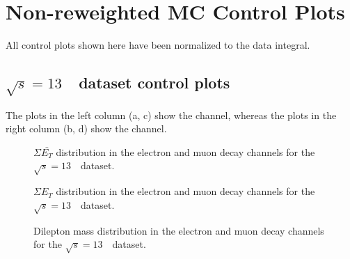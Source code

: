 \section{\ptz Non-reweighted MC Control Plots}
\label{sec:zpt_nonrew_cp}

All control plots shown here have been normalized to the data integral.

\subsection{$\sqrt{s} = 13$~\TeV\ dataset control plots}
\label{subsec:Z_CP_MCnorew}
The plots in the left column (a, c) show the \Zee channel, whereas the plots in the right column (b, d) show the \Zmm channel.

\begin{figure}[h]
\centering
{}
\caption{$\Sigma \bar{E_T}$ distribution in the electron and muon \Zboson decay channels for the $\sqrt{s} = 13$~\TeV\ dataset. }\end{figure}
%

\begin{figure}[h]
\centering
{}
\caption{$\Sigma{E_T}$ distribution in the electron and muon \Zboson decay channels for the $\sqrt{s} = 13$~\TeV\ dataset. }\end{figure}


\begin{figure}[h]
\centering
{}
\caption{Dilepton mass distribution in the electron and muon \Zboson decay channels for the $\sqrt{s} = 13$~\TeV\ dataset. }\end{figure}


